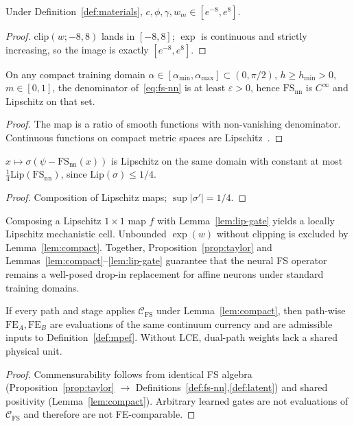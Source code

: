 \begin{lemma}
\label{lem:compact}
Under Definition~\ref{def:materials}, \(c,\phi,\gamma,w_m\in[e^{-8},e^{8}]\).
\end{lemma}
\begin{proof}
\(\mathrm{clip}(w;-8,8)\) lands in \([-8,8]\); \(\exp\) is continuous and strictly increasing, so the image is exactly \([e^{-8},e^{8}]\).
\end{proof}

\begin{lemma}
\label{lem:lip-fs}
On any compact training domain \(\alpha\in[\alpha_{\min},\alpha_{\max}]\subset(0,\pi/2)\), \(h\ge h_{\min}>0\), \(m\in[0,1]\), the denominator of~\eqref{eq:fs-nn} is at least \(\varepsilon>0\), hence \(\mathrm{FS}_{\mathrm{nn}}\) is \(C^{\infty}\) and Lipschitz on that set.
\end{lemma}
\begin{proof}
The map is a ratio of smooth functions with non-vanishing denominator. Continuous functions on compact metric spaces are Lipschitz~\cite{boyd2004convex,lipschitzseg2025}.
\end{proof}

\begin{lemma}
\label{lem:lip-gate}
\(x\mapsto\sigma(\psi-\mathrm{FS}_{\mathrm{nn}}(x))\) is Lipschitz on the same domain with constant at most \(\tfrac14\mathrm{Lip}(\mathrm{FS}_{\mathrm{nn}})\), since \(\mathrm{Lip}(\sigma)\le 1/4\).
\end{lemma}
\begin{proof}
Composition of Lipschitz maps; \(\sup|\sigma'|=1/4\).
\end{proof}

\begin{proposition}
\label{prop:nonexp}
Composing a Lipschitz \(1\times1\) map \(f\) with Lemma~\ref{lem:lip-gate} yields a locally Lipschitz mechanistic cell. Unbounded \(\exp(w)\) without clipping is excluded by Lemma~\ref{lem:compact}. Together, Proposition~\ref{prop:taylor} and Lemmas~\ref{lem:compact}--\ref{lem:lip-gate} guarantee that the neural FS operator remains a well-posed drop-in replacement for affine neurons under standard training domains.
\end{proposition}

\begin{theorem}
\label{thm:lce}
If every path and stage applies \(\mathcal{C}_{\mathrm{FS}}\) under Lemma~\ref{lem:compact}, then path-wise \(\mathrm{FE}_A,\mathrm{FE}_B\) are evaluations of the same continuum currency and are admissible inputs to Definition~\ref{def:mpef}. Without LCE, dual-path weights lack a shared physical unit.
\end{theorem}
\begin{proof}
Commensurability follows from identical FS algebra (Proposition~\ref{prop:taylor} \(\rightarrow\) Definitions~\ref{def:fs-nn},\ref{def:latent}) and shared positivity (Lemma~\ref{lem:compact}). Arbitrary learned gates are not evaluations of \(\mathcal{C}_{\mathrm{FS}}\) and therefore are not FE-comparable.
\end{proof}

